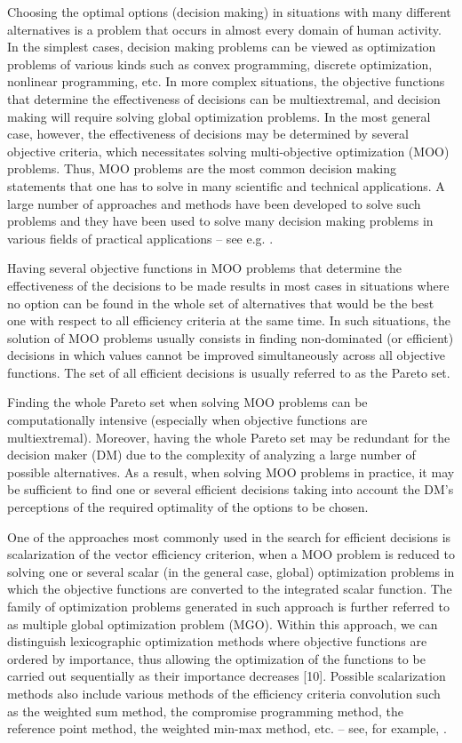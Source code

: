 \documentclass[runningheads]{llncs}
\begin{document}
Choosing the optimal options (decision making) in situations with many different alternatives is a problem that occurs in almost every domain of human activity. In the simplest cases, decision making problems can be viewed as optimization problems of various kinds such as convex programming, discrete optimization, nonlinear programming, etc. In more complex situations, the objective functions that determine the effectiveness of decisions can be multiextremal, and decision making will require solving global optimization problems. In the most general case, however, the effectiveness of decisions may be determined by several objective criteria, which necessitates solving multi-objective optimization (MOO) problems. Thus, MOO problems are the most common decision making statements that one has to solve in many scientific and technical applications. A large number of approaches and methods have been developed to solve such problems and they have been used to solve many decision making problems in various fields of practical applications -- see e.g. \cite{c1,c2,c3,c4,c5,c6,c7,c8,c9}.

Having several objective functions in MOO problems that determine the effectiveness of the decisions to be made results in most cases in situations where no option can be found in the whole set of alternatives that would be the best one with respect to all efficiency criteria at the same time. In such situations, the solution of MOO problems usually consists in finding non-dominated (or efficient) decisions in which values cannot be improved simultaneously across all objective functions. The set of all efficient decisions is usually referred to as the Pareto set.

Finding the whole Pareto set when solving MOO problems can be computationally intensive (especially when objective functions are multiextremal). Moreover, having the whole Pareto set may be redundant for the decision maker (DM) due to the complexity of analyzing a large number of possible alternatives. As a result, when solving MOO problems in practice, it may be sufficient to find one or several efficient decisions taking into account the DM's perceptions of the required optimality of the options to be chosen.

One of the approaches most commonly used in the search for efficient decisions is scalarization of the vector efficiency criterion, when a MOO problem is reduced to solving one or several scalar (in the general case, global) optimization problems in which the objective functions are converted to the integrated scalar function. The family of optimization problems generated in such approach is further referred to as multiple global optimization problem (MGO). Within this approach, we can distinguish lexicographic optimization methods where objective functions are ordered by importance, thus  allowing the optimization of the functions to be carried out sequentially as their importance decreases [10]. Possible scalarization methods also include various methods of the efficiency criteria convolution such as the weighted sum method, the compromise programming method, the reference point method, the weighted min-max method, etc. -- see, for example, \cite{c2,c11,c12}. 
\end{document}
